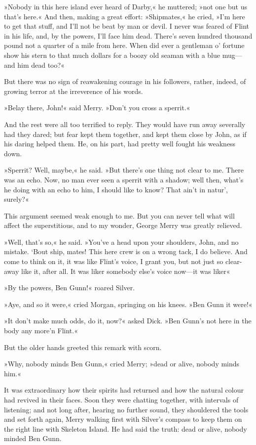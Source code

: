 »Nobody in this here island ever heard of Darby,« he muttered; »not one but us that's here.« And then, making a great effort: »Shipmates,« he cried, »I'm here to get that stuff, and I'll not be beat by man or devil. I never was feared of Flint in his life, and, by the powers, I'll face him dead. There's seven hundred thousand pound not a quarter of a mile from here. When did ever a gentleman o' fortune show his stern to that much dollars for a boozy old seaman with a blue mug—and him dead too?«

But there was no sign of reawakening courage in his followers, rather, indeed, of growing terror at the irreverence of his words.

»Belay there, John!« said Merry. »Don't you cross a sperrit.«

And the rest were all too terrified to reply. They would have run away severally had they dared; but fear kept them together, and kept them close by John, as if his daring helped them. He, on his part, had pretty well fought his weakness down.

»Sperrit? Well, maybe,« he said. »But there's one thing not clear to me. There was an echo. Now, no man ever seen a sperrit with a shadow; well then, what's he doing with an echo to him, I should like to know? That ain't in natur', surely?«

This argument seemed weak enough to me. But you can never tell what will affect the superstitious, and to my wonder, George Merry was greatly relieved.

»Well, that's so,« he said. »You've a head upon your shoulders, John, and no mistake. `Bout ship, mates! This here crew is on a wrong tack, I do believe. And come to think on it, it was like Flint's voice, I grant you, but not just so clear-away like it, after all. It was liker somebody else's voice now—it was liker\longdash«

»By the powers, Ben Gunn!« roared Silver.

»Aye, and so it were,« cried Morgan, springing on his knees. »Ben Gunn it were!«

»It don't make much odds, do it, now?« asked Dick. »Ben Gunn's not here in the body any more'n Flint.«

But the older hands greeted this remark with scorn.

»Why, nobody minds Ben Gunn,« cried Merry; »dead or alive, nobody minds him.«

It was extraordinary how their spirits had returned and how the natural colour had revived in their faces. Soon they were chatting together, with intervals of listening; and not long after, hearing no further sound, they shouldered the tools and set forth again, Merry walking first with Silver's compass to keep them on the right line with Skeleton Island. He had said the truth: dead or alive, nobody minded Ben Gunn.

